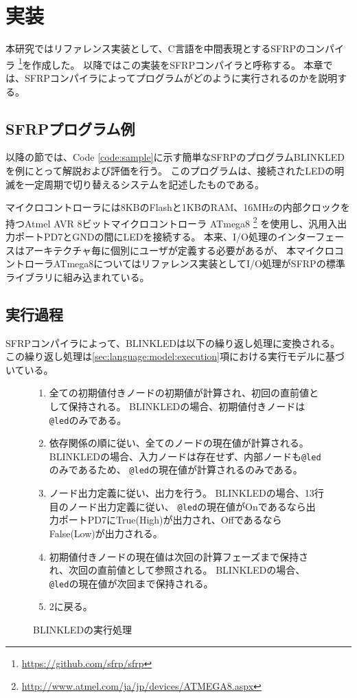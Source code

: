 \chapter{実装}\label{sec:implementation}
本研究ではリファレンス実装として、C言語を中間表現とするSFRPのコンパイラ
\footnote{\url{https://github.com/sfrp/sfrp}}を作成した。
以降ではこの実装をSFRPコンパイラと呼称する。
本章では、SFRPコンパイラによってプログラムがどのように実行されるのかを説明する。

\section{SFRPプログラム例}\label{sec:implementation:example}
以降の節では、Code \ref{code:sample}に示す簡単なSFRPのプログラムBLINKLEDを例にとって解説および評価を行う。
このプログラムは、接続されたLEDの明滅を一定周期で切り替えるシステムを記述したものである。

マイクロコントローラには8KBのFlashと1KBのRAM、16MHzの内部クロックを持つAtmel AVR 8ビットマイクロコントローラ ATmega8
\footnote{\url{http://www.atmel.com/ja/jp/devices/ATMEGA8.aspx}}
を使用し、汎用入出力ポートPD7とGNDの間にLEDを接続する。
本来、I/O処理のインターフェースはアーキテクチャ毎に個別にユーザが定義する必要があるが、
本マイクロコントローラATmega8についてはリファレンス実装としてI/O処理がSFRPの標準ライブラリに組み込まれている。

\newpage



\section{実行過程}\label{sec:implementation:execution}
SFRPコンパイラによって、BLINKLEDは以下の繰り返し処理に変換される。
この繰り返し処理は\ref{sec:language:model:execution}項における実行モデルに基づいている。
\begin{figure}[h]
\begin{screen}
\begin{enumerate}
  \item 全ての初期値付きノードの初期値が計算され、初回の直前値として保持される。
    BLINKLEDの場合、初期値付きノードは\texttt{@led}のみである。
  \item 依存関係の順に従い、全てのノードの現在値が計算される。
    BLINKLEDの場合、入力ノードは存在せず、内部ノードも\texttt{@led}のみであるため、
    \texttt{@led}の現在値が計算されるのみである。
  \item ノード出力定義に従い、出力を行う。
    BLINKLEDの場合、13行目のノード出力定義に従い、
    \texttt{@led}の現在値がOnであるなら出力ポートPD7にTrue(High)が出力され、OffであるならFalse(Low)が出力される。
  \item 初期値付きノードの現在値は次回の計算フェーズまで保持され、次回の直前値として参照される。
    BLINKLEDの場合、\texttt{@led}の現在値が次回まで保持される。
  \item 2に戻る。
\end{enumerate}
\end{screen}
\caption{BLINKLEDの実行処理}
\label{fig:imp:exec}
\end{figure}

